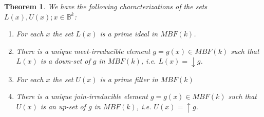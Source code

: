 \documentclass[10pt,letterpaper]{article}
\newcommand{\bbB}{\mathbb{B}}
\newtheorem{thm}{Theorem}[section]
\begin{document}
\begin{thm} \label{thm:main}
We have the following characterizations of the sets $L(x),U(x); x \in \bbB^k$:
\begin{enumerate}
    \item For each $x$ the set $L(x)$ is a prime ideal in $MBF(k)$.
    \item There is a unique meet-irreducible element $g=g(x) \in MBF(k)$ such that $L(x)$ is a down-set of $g$ in $ MBF(k)$, i.e. $L(x)= \downarrow g$.
    \item For each $x$ the set $U(x)$ is a prime filter in $MBF(k)$
    \item There is a unique join-irreducible element $g=g(x) \in MBF(k)$ such that $U(x)$ is an up-set of $g$ in $ MBF(k)$, i.e. $U(x)= \uparrow g$.
\end{enumerate}
\end{thm}
\end{document}
